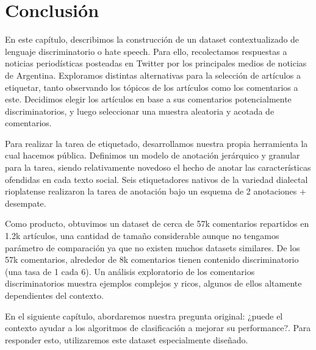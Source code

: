 \section{Conclusión}

En este capítulo, describimos la construcción de un dataset contextualizado de lenguaje discriminatorio o hate speech. Para ello, recolectamos respuestas a noticias periodísticas posteadas en Twitter por los principales medios de noticias de Argentina. Exploramos distintas alternativas para la selección de artículos a etiquetar, tanto observando los tópicos de los artículos como los comentarios a este. Decidimos elegir los artículos en base a sus comentarios potencialmente discriminatorios, y luego seleccionar una muestra aleatoria y acotada de comentarios.

Para realizar la tarea de etiquetado, desarrollamos nuestra propia herramienta la cual hacemos pública. Definimos un modelo de anotación jerárquico y granular para la tarea, siendo relativamente novedoso el hecho de anotar las características ofendidas en cada texto social. Seis etiquetadores nativos de la variedad dialectal rioplatense realizaron la tarea de anotación bajo un esquema de 2 anotaciones + desempate.

Como producto, obtuvimos un dataset de cerca de 57k comentarios repartidos en 1.2k artículos, una cantidad de tamaño considerable aunque no tengamos parámetro de comparación ya que no existen muchos datasets similares. De los 57k comentarios, alrededor de 8k comentarios tienen contenido discriminatorio (una tasa de 1 cada 6). Un análisis exploratorio de los comentarios discriminatorios muestra ejemplos complejos y ricos, algunos de ellos altamente dependientes del contexto.

En el siguiente capítulo, abordaremos nuestra pregunta original: ¿puede el contexto ayudar a los algoritmos de clasificación a mejorar su performance?. Para responder esto, utilizaremos este dataset especialmente diseñado.
